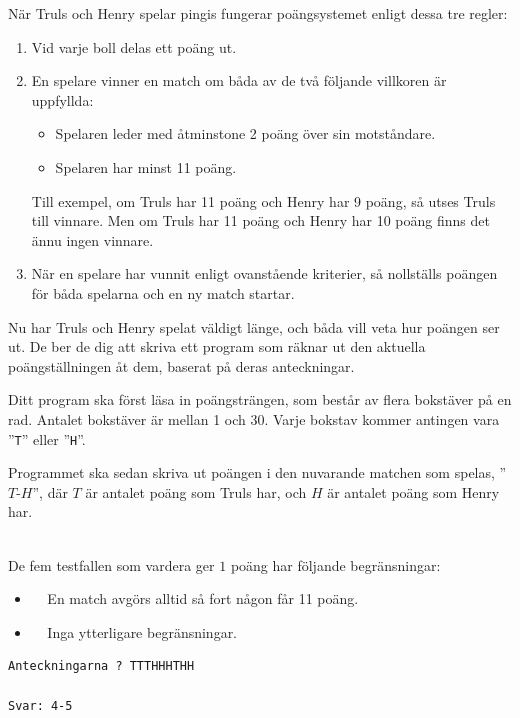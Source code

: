 När Truls och Henry spelar pingis fungerar poängsystemet enligt dessa tre regler:
\begin{enumerate}
  \item Vid varje boll delas ett poäng ut.
  \item En spelare vinner en match om båda av de två följande villkoren är uppfyllda:
  \begin{itemize}
    \item Spelaren leder med åtminstone 2 poäng över sin motståndare.
    \item Spelaren har minst 11 poäng.
  \end{itemize}
  Till exempel, om Truls har 11 poäng och Henry har 9 poäng, så utses Truls till vinnare. Men om Truls har 11 poäng och Henry har 10 poäng finns det ännu ingen vinnare.

  \item När en spelare har vunnit enligt ovanstående kriterier, så nollställs poängen för båda spelarna och en ny match startar.
\end{enumerate}

Nu har Truls och Henry spelat väldigt länge, och båda vill veta hur poängen ser ut.
De ber de dig att skriva ett program som
räknar ut den aktuella poängställningen åt dem, baserat på deras anteckningar.

Ditt program ska först läsa in poängsträngen, som består av flera bokstäver på en rad. Antalet bokstäver är mellan 1 och 30. 
Varje bokstav kommer antingen vara ”\texttt{T}” eller ”\texttt{H}”.

Programmet ska sedan skriva ut poängen i den nuvarande matchen som spelas, ”$T$-$H$”, där $T$ är antalet poäng som Truls har, och $H$ är antalet poäng som Henry har.

\\
De fem testfallen som vardera ger $1$ poäng har följande begränsningar:
\begin{itemize}
  \item[(1-2)] $\;\;\;\;$En match avgörs alltid så fort någon får 11 poäng.
  \item[(3-5)] $\;\;\;\; $Inga ytterligare begränsningar.
\end{itemize}

\vspace{1cm}

\begin{verbatim}
Anteckningarna ? TTTHHHTHH

Svar: 4-5
\end{verbatim}

